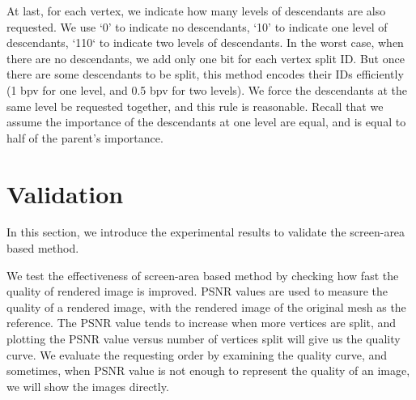 
    At last, for each vertex, we indicate how many levels of descendants are also requested.
    We use `0' to indicate no descendants, `10' to indicate one level of descendants,
    `110` to indicate two levels of descendants. 
    In the worst case, when there are no descendants, we add only one bit for each vertex split
    ID. But once there are some descendants to be split, this method encodes their IDs 
    efficiently (1 bpv for one level, and 0.5 bpv for two levels). 
    We force the descendants at the same level be requested together, and 
    this rule is reasonable. Recall that we assume the importance of the descendants at one level are equal, 
    and is equal to half of the parent's importance.
\section{Validation}
\label{s:dstream:evaluation}
In this section, we introduce the experimental results to 
validate the screen-area based method.

We test the effectiveness of screen-area based method by checking
how fast the quality of rendered image is improved. PSNR values
are used to measure the quality of a rendered
image, with the rendered image of the original mesh as the reference. 
The PSNR value tends to increase when more vertices are split, 
and plotting the PSNR value versus number of vertices split
will give us the quality curve. 
We evaluate the requesting order by examining the quality
curve, and sometimes, when PSNR value is not enough to 
represent the quality of an image, we will show the images directly.

